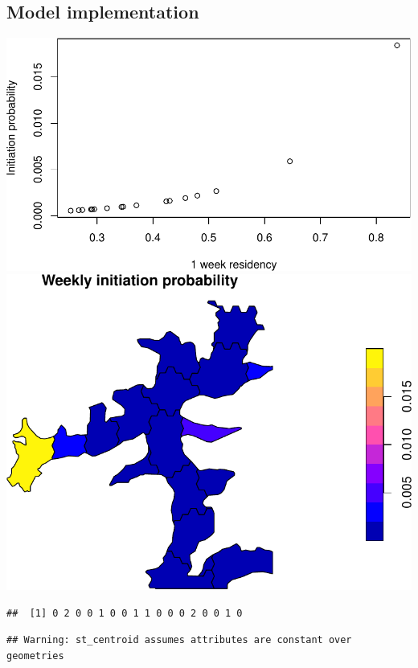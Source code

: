 \documentclass[
]{article}
\begin{document}
\hypertarget{model-implementation}{%
\subsection{Model implementation}\label{model-implementation}}

\includegraphics{habmodel_files/figure-latex/unnamed-chunk-10-1.pdf}
\includegraphics{habmodel_files/figure-latex/unnamed-chunk-10-2.pdf}

\begin{verbatim}
##  [1] 0 2 0 0 1 0 0 1 1 0 0 0 2 0 0 1 0
\end{verbatim}

\begin{verbatim}
## Warning: st_centroid assumes attributes are constant over geometries
\end{verbatim}
\end{document}

